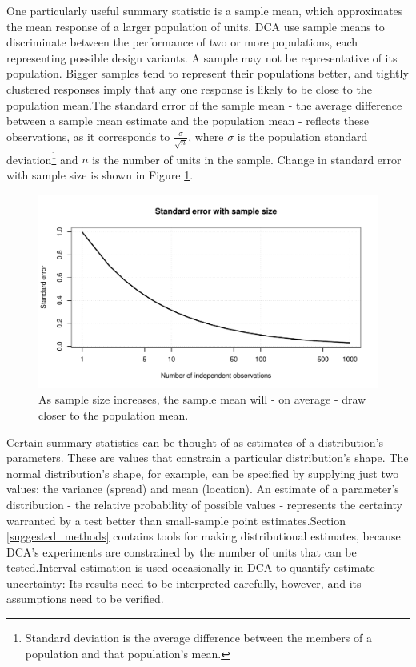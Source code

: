 \documentclass[11pt,a4paper,article]{memoir} %
\begin{document}
 \par
One particularly useful summary statistic is a sample mean, which approximates the mean response of a larger population of units. DCA use sample means to discriminate between the performance of two or more populations, each representing possible design variants. A sample may not be representative of its population. Bigger samples tend to represent their populations better, and tightly clustered responses imply that any one response is likely to be close to the population mean.The standard error of the sample mean - the average difference between a sample mean estimate and the population mean - reflects these observations, as it corresponds to $\frac{\sigma}{\sqrt{n}}$, where $\sigma$ is the population standard deviation\footnote{Standard deviation is the average difference between the members of a population and that population's mean.} and $n$ is the number of units in the sample. Change in standard error with sample size is shown in Figure \ref{fig:se_with_sample_size}.
\begin{figure}[h]
\includegraphics[width=\textwidth]{se_with_sample_size.pdf}
\caption{As sample size increases, the sample mean will - on average - draw closer to the population mean.}
\label{fig:se_with_sample_size}
\end{figure}

Certain summary statistics can be thought of as estimates of a distribution's parameters. These are values that constrain a particular distribution's shape. The normal distribution's shape, for example, can be specified by supplying just two values: the variance (spread) and mean (location). An estimate of a parameter's distribution - the relative probability of possible values - represents the certainty warranted by a test better than small-sample point estimates.Section \ref{suggested_methods} contains tools for making distributional estimates, because DCA's experiments are constrained by the number of units that can be tested.Interval estimation is used occasionally in DCA to quantify estimate uncertainty: Its results need to be interpreted carefully, however, and its assumptions need to be verified.
\end{document}

